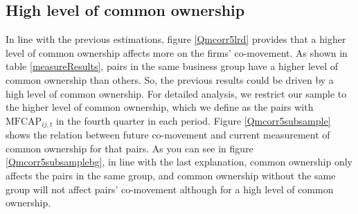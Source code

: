 		\subsection{{High level of common ownership}}
		
			In line with the previous estimations, figure \ref{Qmcorr5lrd} provides that a higher level of common ownership affects more on the firms' co-movement. As shown in table \ref{measureResults}, pairs in the same business group have a higher level of common ownership than others. So, the previous results could be driven by a high level of common ownership. For detailed analysis, we restrict our sample to the higher level of common ownership, which we define as the pairs with $\text{MFCAP}_{ij,t}$ in the fourth quarter in each period. Figure \ref{Qmcorr5subsample} shows the relation between future co-movement and current measurement of common ownership for that pairs. As you can see in figure \ref{Qmcorr5subsamplebg}, in line with the last explanation, common ownership only affects the pairs in the same group, and common ownership without the same group will not affect pairs' co-movement although for a high level of common ownership.
			
